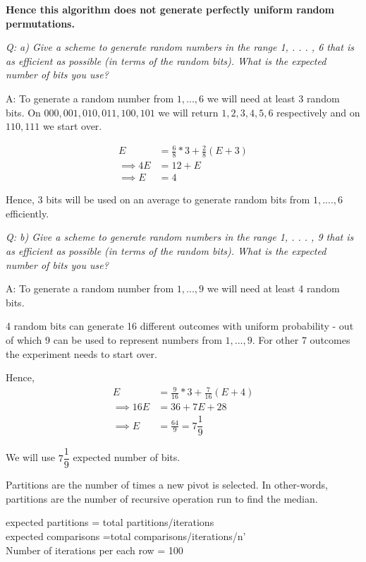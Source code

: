 \documentclass{homeworg}
\begin{document}
\textbf{ Hence this algorithm does not generate perfectly uniform random permutations. }


\newpage

\exercise
\emph {Q: a) Give a scheme to generate random numbers in the range 1, . . . , 6 that is as efficient as possible
(in terms of the random bits). What is the expected number of bits you use?}

A: To generate a random number from $1, ..., 6$ we will need at least 3 random bits. 
On $000, 001,010,011, 100,101$  we will return $1,2,3,4,5,6$ respectively and on $110,111$ we start over.

\begin{align*}
E   &= \frac{6}{8} \ast 3 + \frac{2}{8} (E + 3)\\
\implies 4E  &= 12 + E \\
\implies E  &= 4
\end{align*} 


Hence, $3$ bits will be used on an average to generate random bits from $1,....,6$ efficiently. 

\emph {Q: b)  Give a scheme to generate random numbers in the range 1, . . . , 9 that is as efficient as possible
(in terms of the random bits). What is the expected number of bits you use?}

A: To generate a random number from $1, ..., 9$ we will need at least 4 random bits.

4 random bits can generate 16 different  outcomes with uniform probability - out of which 9 can be used to represent numbers from $1, ..., 9$. For other 7 outcomes the experiment needs to start over. 

Hence,
\begin{align*}
    E & = \frac{9}{16} \ast 3 + \frac{7}{16} (E+4)\\
    \implies 16E & = 36 + 7E + 28\\
    \implies E & = \frac{64}{9} = 7\dfrac{1}{9} 
\end{align*}

We will use $7\dfrac{1}{9}$ expected number of bits.
\newpage

\exercise
Partitions are the number of times a new pivot is selected. In other-words, partitions are the number of recursive operation run to find the median. 

expected partitions = total partitions/iterations\\
expected comparisons =total comparisons/iterations/n'\\
Number of iterations per each row = 100
\end{document}

